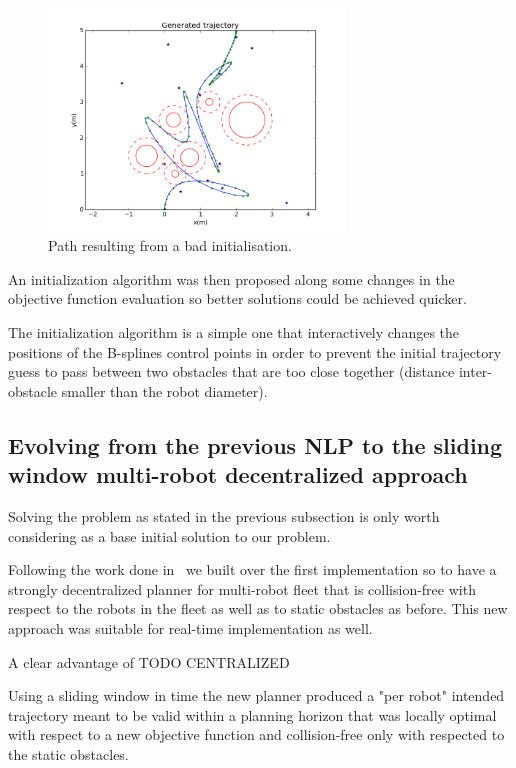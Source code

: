 \begin{figure}[!h]
	\centering
	\includegraphics[width=0.7\textwidth]{./images/planning-sim-trajc.png}
	\caption{Path resulting from a bad initialisation.\label{fig:planning-sim-trajc}}
\end{figure}

An initialization algorithm was then proposed along some changes in the objective function evaluation so better solutions could be achieved quicker.

The initialization algorithm is a simple one that interactively changes the positions of the B-splines control points in order to prevent the initial trajectory guess to pass between two obstacles that are too close together (distance inter-obstacle smaller than the robot diameter).

\subsection{Evolving from the previous NLP to the sliding window multi-robot decentralized approach}

Solving the problem as stated in the previous subsection is only worth considering as a base initial solution to our problem.

Following the work done in~\cite{Defoort2007a} we built over the first implementation so to have a strongly decentralized planner for multi-robot fleet that is collision-free with respect to the robots in the fleet as well as to static obstacles as before. This new approach was suitable for real-time implementation as well.

A clear advantage of TODO CENTRALIZED

Using a sliding window in time the new planner produced a "per robot" intended trajectory meant to be valid within a planning horizon that was locally optimal with respect to a new objective function and collision-free only with respected to the static obstacles.

